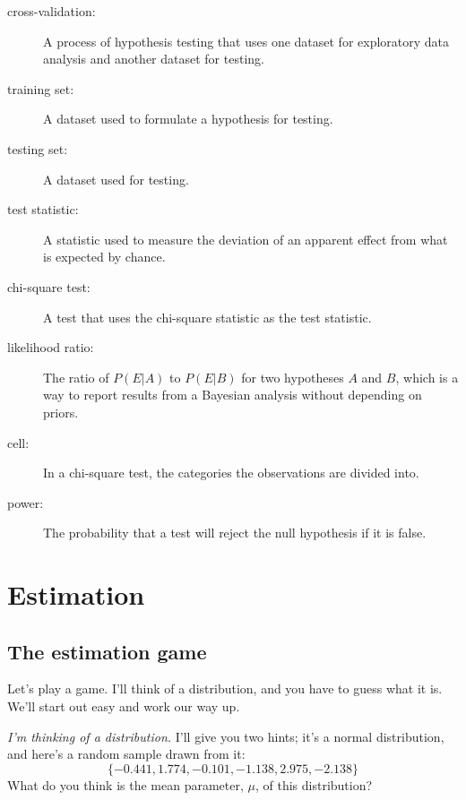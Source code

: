 \documentclass[12pt]{book}
\begin{document}
\begin{description}
\item[cross-validation:] A process of hypothesis testing that uses one
dataset for exploratory data analysis and another dataset for testing.

\item[training set:] A dataset used to formulate a hypothesis for testing.

\item[testing set:] A dataset used for testing.

\item[test statistic:] A statistic used to measure the deviation of an
apparent effect from what is expected by chance.

\item[chi-square test:] A test that uses the chi-square statistic as
the test statistic.

\item[likelihood ratio:] The ratio of $P(E|A)$ to $P(E|B)$ for two
hypotheses $A$ and $B$, which is a way to report
results from a Bayesian analysis without depending on priors.

\item[cell:] In a chi-square test, the categories the observations are
divided into.

\item[power:] The probability that a test will reject the null hypothesis
if it is false.

\end{description}



\chapter{Estimation}
\label{estimation}

\section{The estimation game}

Let's play a game.  I'll think of a distribution, and you have to guess
what it is.  We'll start out easy and work our way up.


{\em I'm thinking of a distribution.}  I'll give you two hints; it's a
normal distribution, and here's a random sample drawn from it:
%
\[ \{ -0.441, 1.774, -0.101, -1.138, 2.975, -2.138 \} \]
%
What do you think is the mean parameter, $\mu$, of this distribution?
\end{document}
